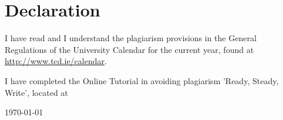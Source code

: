 \clearpage
\thispagestyle{empty}
\section*{Declaration}
\label{sec:SOOA}

\vspace{1cm}

I have read and I understand the plagiarism provisions in the General 
Regulations of the University Calendar for the current year, found at 
\url{http://www.tcd.ie/calendar}.

\vspace{1cm}

\noindent
I have completed the Online Tutorial in avoiding plagiarism 'Ready, Steady, 
Write', located at %

\vspace{1cm}
\noindent
\textbf{\thesisauthor{}} 

\vspace{0.5cm}
\noindent
\today
